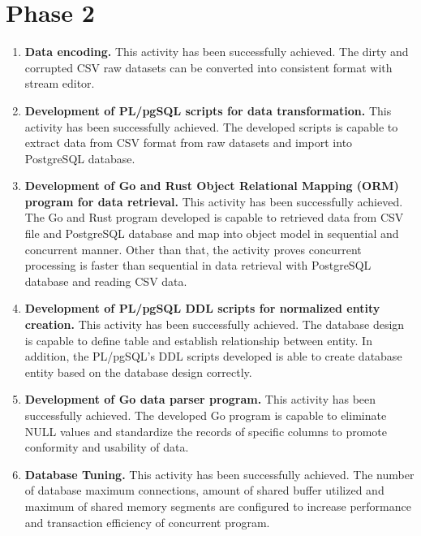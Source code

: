 \section{Phase 2}

\begin{enumerate}[topsep=0pt,itemsep=-1ex,partopsep=1ex,parsep=1.5ex]
	
	\item \textbf{Data encoding.} This activity has been successfully achieved. The dirty and corrupted CSV raw datasets can be converted into consistent format with stream editor. 
	
	\item \textbf{Development of PL/pgSQL scripts for data transformation.} This activity has been successfully achieved. The developed scripts is capable to extract data from CSV format from raw datasets and import into PostgreSQL database. 
	
	\item \textbf{Development of Go and Rust Object Relational Mapping (ORM) program for data retrieval.} This activity has been successfully achieved. The Go and Rust program developed is capable to retrieved data from CSV file and PostgreSQL database and map into object model in sequential and concurrent manner. Other than that, the activity proves concurrent processing is faster than sequential in data retrieval with PostgreSQL database and reading CSV data. 
	
	\item \textbf{Development of PL/pgSQL DDL scripts for normalized entity creation.} This activity has been successfully achieved. The database design is capable to define table and establish relationship between entity. In addition, the PL/pgSQL's DDL scripts developed is able to create database entity based on the database design correctly.
	
	\item \textbf{Development of Go data parser program.} This activity has been successfully achieved. The developed Go program is capable to eliminate NULL values and standardize the records of specific columns to promote conformity and usability of data. 
	
	\item \textbf{Database Tuning.} This activity has been successfully achieved. The number of database maximum connections, amount of shared buffer utilized and maximum of shared memory segments are configured to increase performance and transaction efficiency of concurrent program. 
	

\end{enumerate}
